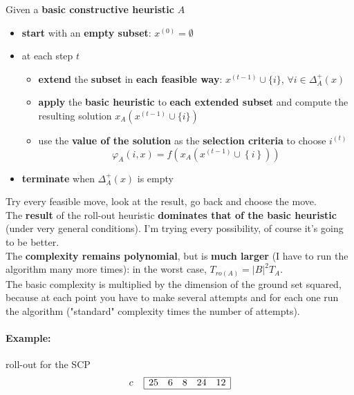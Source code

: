 \documentclass[11pt]{article}
\begin{document}
	Given a \textbf{basic constructive heuristic} $A$
	\begin{itemize}
		\item \textbf{start} with an \textbf{empty subset}: $x^{(0)} = \emptyset$
		
		\item at each step $t$
		\begin{itemize}
			\item \textbf{extend} the \textbf{subset} in \textbf{each feasible way}: $x^{(t−1)} \cup \{i\}$, $\forall i \in \Delta_A^+ (x)$
			
			\item \textbf{apply} the \textbf{basic heuristic} to \textbf{each extended subset} and compute the resulting solution $x_A (x^{(t−1)} \cup \{i\})$
			
			\item use the \textbf{value of the solution} as the \textbf{selection criteria} to choose $i^(t)$
			$$ \varphi_A (i,x) = f \left(x_A \left(x^{(t-1)} \cup \left\{i\right\} \right) \right)$$
		\end{itemize}
		
		\item \textbf{terminate} when $\Delta_A^+ (x)$ is empty
	\end{itemize}
	
	Try every feasible move, look at the result, go back and choose the move. \\
	
	The \textbf{result} of the roll-out heuristic \textbf{dominates that of the basic heuristic} (under very general conditions). I'm trying every possibility, of course it's going to be better.\\
	
	The \textbf{complexity remains polynomial}, but is \textbf{much larger} (I have to run the algorithm many more times): in the worst case, $T_{ro(A)} = |B|^2 T_A$.\\
	
	The basic complexity is multiplied by the dimension of the ground set squared, because at each point you have to make several attempts and for each one run the algorithm ("standard" complexity times the number of attempts).\\
	
	\newpage
	
	\paragraph{Example:} roll-out for the SCP
	$$
	c \;\;\;\;
	\begin{array}{| c c c c c |}
		\hline
		25 & 6 & 8 & 24 & 12 \\
		\hline
	\end{array}
	$$
	
\end{document}

